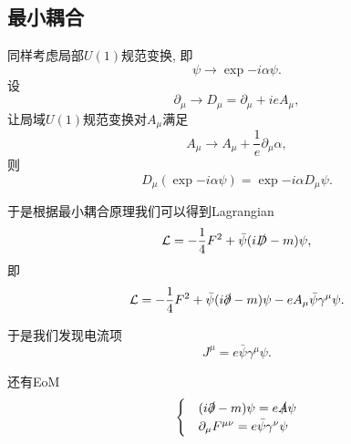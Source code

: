\subsection{最小耦合}
同样考虑局部$U(1)$规范变换, 即
\begin{equation}
    \psi\to\exp{-i\alpha}\psi.
\end{equation}
设
\begin{equation}
    \partial_\mu\to D_\mu=\partial_\mu+ieA_\mu,
\end{equation}
让局域$U(1)$规范变换对$A_\mu$满足
\begin{equation}
    A_\mu\to A_\mu+\frac1e\partial_\mu\alpha,
\end{equation}
则
\begin{equation}
    D_\mu(\exp{-i\alpha}\psi)=\exp{-i\alpha}D_\mu\psi.
\end{equation}

于是根据最小耦合原理我们可以得到Lagrangian
\begin{equation}
    \mathcal L=-\frac14F^2+\bar\psi(i\slashed D-m)\psi,
\end{equation}
即
\begin{equation}
    \mathcal L=-\frac14F^2+\bar\psi(i\slashed \partial-m)\psi-eA_\mu\bar\psi\gamma^\mu\psi.
\end{equation}

于是我们发现电流项
\begin{equation}
    J^\mu=e\bar\psi\gamma^\mu\psi.
\end{equation}

还有EoM
\begin{align}
    \begin{cases}
        &(i\slashed\partial-m)\psi=e\slashed A\psi\\
        &\partial_\mu F^{\mu\nu}=e\bar\psi\gamma^\nu\psi
    \end{cases}
\end{align}

